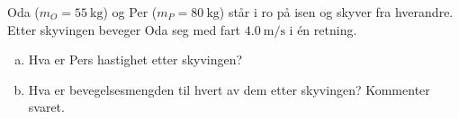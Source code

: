 %
Oda ($m_O = \SI{55}{\kilo\gram}$) og Per ($m_P = \SI{80}{\kilo\gram}$) står i ro på isen og skyver fra hverandre. Etter skyvingen beveger Oda seg med fart $\SI{4.0}{\metre\per\second}$ i én retning.
\begin{enumerate}[a)]
    \item Hva er Pers hastighet etter skyvingen?
    \item Hva er bevegelsesmengden til hvert av dem etter skyvingen? Kommenter svaret.
\end{enumerate}
